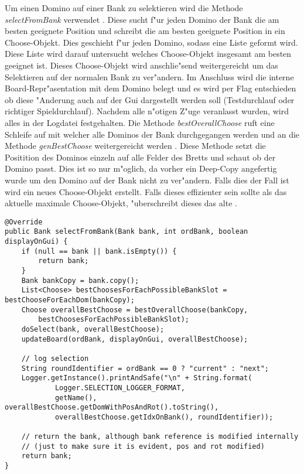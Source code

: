 Um einen Domino auf einer Bank zu selektieren wird die Methode \emph{selectFromBank} verwendet . Diese sucht f"ur jeden Domino der Bank die am besten geeignete Position und schreibt die am besten geeignete Position in ein Choose-Objekt. Dies geschieht f"ur jeden Domino, sodass eine Liste geformt wird. Diese Liste wird darauf untersucht welches Choose-Objekt insgesamt am besten geeignet ist. Dieses Choose-Objekt wird anschlie"send weitergereicht um das Selektieren auf der normalen Bank zu ver"andern. Im Anschluss wird die interne Board-Repr"asentation mit dem Domino belegt und es wird per Flag entschieden ob diese "Anderung auch auf der Gui dargestellt werden soll (Testdurchlauf oder richtiger Spieldurchlauf). Nachdem alle n"otigen Z"uge veranlasst wurden, wird alles in der Logdatei festgehalten. Die Methode \emph{bestOverallChoose} ruft eine Schleife auf mit welcher alle Dominos der Bank durchgegangen werden und an die Methode \emph{genBestChoose} weitergereicht werden . Diese Methode setzt die Positition des Dominos einzeln auf alle Felder des Bretts und schaut ob der Domino passt. Dies ist so nur m"oglich, da vorher ein Deep-Copy angefertig wurde um den Domino auf der Bank nicht zu ver"andern. Falls dies der Fall ist wird ein neues Choose-Objekt erstellt. Falls dieses effizienter sein sollte als das aktuelle maximale Choose-Objekt, "uberschreibt dieses das alte . 

\begin{lstlisting}[float,style=CodeHighlighting,caption=DefaultAIPlayer - selectFromBank,label=lst:defaultAIPlayer_selectFromBank]
@Override
public Bank selectFromBank(Bank bank, int ordBank, boolean displayOnGui) {
    if (null == bank || bank.isEmpty()) {
        return bank;
    }
    Bank bankCopy = bank.copy();
    List<Choose> bestChoosesForEachPossibleBankSlot = bestChooseForEachDom(bankCopy);
    Choose overallBestChoose = bestOverallChoose(bankCopy, 
    	bestChoosesForEachPossibleBankSlot);
    doSelect(bank, overallBestChoose);
    updateBoard(ordBank, displayOnGui, overallBestChoose);

    // log selection
    String roundIdentifier = ordBank == 0 ? "current" : "next";
    Logger.getInstance().printAndSafe("\n" + String.format(
    		Logger.SELECTION_LOGGER_FORMAT,
            getName(), overallBestChoose.getDomWithPosAndRot().toString(),
            overallBestChoose.getIdxOnBank(), roundIdentifier));

    // return the bank, although bank reference is modified internally
    // (just to make sure it is evident, pos and rot modified)
    return bank;
}
\end{lstlisting}

